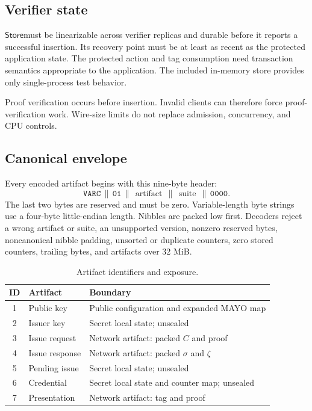 \documentclass[11pt]{article}
\newcommand{\concat}{\,\|\,}
\newcommand{\Store}{\ensuremath{\mathsf{Store}}}
\newcommand{\domain}[1]{\texttt{#1}}
\theoremstyle{remark}
\begin{document}
\subsection{Verifier state}

\Store must be linearizable across verifier replicas and durable before it
reports a successful insertion. Its recovery point must be at least as recent
as the protected application state. The protected action and tag consumption
need transaction semantics appropriate to the application. The included
in-memory store provides only single-process test behavior.

Proof verification occurs before insertion. Invalid clients can therefore
force proof-verification work. Wire-size limits do not replace admission,
concurrency, and CPU controls.

\subsection{Canonical envelope}

Every encoded artifact begins with this nine-byte header:
\[
  \domain{VARC} \concat
  \domain{01} \concat
  \operatorname{artifact} \concat
  \operatorname{suite} \concat
  \domain{0000}.
\]
The last two bytes are reserved and must be zero. Variable-length byte strings
use a four-byte little-endian length. Nibbles are packed low first. Decoders
reject a wrong artifact or suite, an unsupported version, nonzero reserved
bytes, noncanonical nibble padding, unsorted or duplicate counters, zero
stored counters, trailing bytes, and artifacts over 32 MiB.

\begin{table}[H]
  \centering
  \caption{Artifact identifiers and exposure.}
  \begin{tabularx}{\textwidth}{@{}clX@{}}
    \toprule
    ID & Artifact & Boundary \\
    \midrule
    1 & Public key & Public configuration and expanded MAYO map \\
    2 & Issuer key & Secret local state; unsealed \\
    3 & Issue request & Network artifact: packed $C$ and proof \\
    4 & Issue response & Network artifact: packed $\sigma$ and $\zeta$ \\
    5 & Pending issue & Secret local state; unsealed \\
    6 & Credential & Secret local state and counter map; unsealed \\
    7 & Presentation & Network artifact: tag and proof \\
    \bottomrule
  \end{tabularx}
\end{table}
\end{document}

